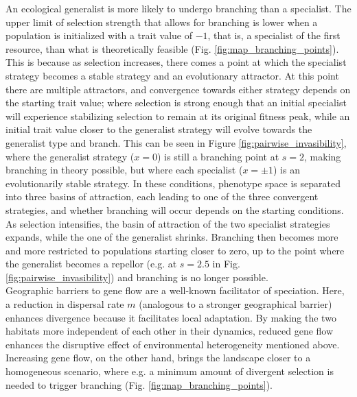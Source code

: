 An ecological generalist is more likely to undergo branching than a specialist. The upper limit of selection strength that allows for branching is lower when a population is initialized with a trait value of $-1$, that is, a specialist of the first resource, than what is theoretically feasible (Fig. \ref{fig:map_branching_points}). This is because as selection increases, there comes a point at which the specialist strategy becomes a stable strategy and an evolutionary attractor. At this point there are multiple attractors, and convergence towards either strategy depends on the starting trait value; where selection is strong enough that an initial specialist will experience stabilizing selection to remain at its original fitness peak, while an initial trait value closer to the generalist strategy will evolve towards the generalist type and branch. This can be seen in Figure \ref{fig:pairwise_invasibility}, where the generalist strategy ($x = 0$) is still a branching point at $s = 2$, making branching in theory possible, but where each specialist ($x = \pm 1$) is an evolutionarily stable strategy. In these conditions, phenotype space is separated into three basins of attraction, each leading to one of the three convergent strategies, and whether branching will occur depends on the starting conditions. As selection intensifies, the basin of attraction of the two specialist strategies expands, while the one of the generalist shrinks. Branching then becomes more and more restricted to populations starting closer to zero, up to the point where the generalist becomes a repellor (e.g. at $s = 2.5$ in Fig. \ref{fig:pairwise_invasibility}) and branching is no longer possible.\\


Geographic barriers to gene flow are a well-known facilitator of speciation. Here, a reduction in dispersal rate $m$ (analogous to a stronger geographical barrier) enhances divergence because it facilitates local adaptation. By making the two habitats more independent of each other in their dynamics, reduced gene flow enhances the disruptive effect of environmental heterogeneity mentioned above. Increasing gene flow, on the other hand, brings the landscape closer to a homogeneous scenario, where e.g. a minimum amount of divergent selection is needed to trigger branching (Fig. \ref{fig:map_branching_points}).\\


